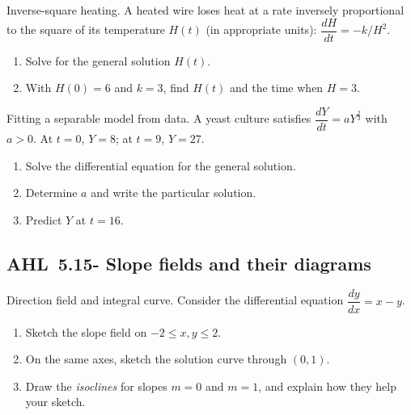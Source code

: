 \documentclass[11pt]{article}
\def\textbf#1{#1}%
\newcommand{\tocsubsection}[1]{\subsection{#1}}
\newcounter{question}
\begin{document}
\begin{question}
\textbf{Inverse-square heating.}
A heated wire loses heat at a rate inversely proportional to the square of its temperature $H(t)$ (in appropriate units): $\dfrac{dH}{dt}=-k/H^{2}$.
\begin{enumerate}
  \item Solve for the general solution $H(t)$.
  \item With $H(0)=6$ and $k=3$, find $H(t)$ and the time when $H=3$.
\end{enumerate}
\end{question}

\begin{question}
\textbf{Fitting a separable model from data.}
A yeast culture satisfies $\dfrac{dY}{dt}=aY^{\frac{2}{3}}$ with $a>0$. At $t=0$, $Y=8$; at $t=9$, $Y=27$.
\begin{enumerate}
  \item Solve the differential equation for the general solution.
  \item Determine $a$ and write the particular solution.
  \item Predict $Y$ at $t=16$.
\end{enumerate}
\end{question}




\tocsubsection{AHL 5.15- Slope fields and their diagrams}


\begin{question}
\textbf{Direction field and integral curve.}
Consider the differential equation $\dfrac{dy}{dx}=x-y$.
\begin{enumerate}
  \item Sketch the slope field on $-2\le x,y\le 2$.
  \item On the same axes, sketch the solution curve through $(0,1)$.
  \item Draw the \emph{isoclines} for slopes $m=0$ and $m=1$, and explain how they help your sketch.
\end{enumerate}

\begin{center}
\end{center}
\end{question}
\end{document}
